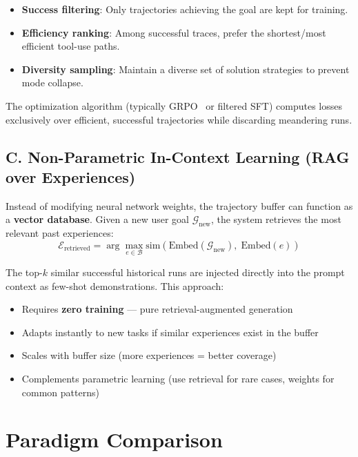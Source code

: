\begin{itemize}
  \item \textbf{Success filtering}: Only trajectories achieving the goal are kept for training.
  \item \textbf{Efficiency ranking}: Among successful traces, prefer the shortest/most efficient tool-use paths.
  \item \textbf{Diversity sampling}: Maintain a diverse set of solution strategies to prevent mode collapse.
\end{itemize}

The optimization algorithm (typically GRPO~\cite{shao2024deepseekmath} or filtered SFT) computes losses exclusively over efficient, successful trajectories while discarding meandering runs.

\subsection{C. Non-Parametric In-Context Learning (RAG over Experiences)}
\label{c.-non-parametric-in-context-learning-rag-over-experiences}

Instead of modifying neural network weights, the trajectory buffer can function as a \textbf{vector database}. Given a new user goal $\mathcal{G}_{\text{new}}$, the system retrieves the most relevant past experiences: 
\begin{equation}
\boxed{\mathcal{E}_{\text{retrieved}} = \arg\max_{e \in \mathcal{B}} \text{sim}\!\left(\text{Embed}(\mathcal{G}_{\text{new}}),\; \text{Embed}(e)\right)}
\end{equation}

The top-$k$ similar successful historical runs are injected directly into the prompt context as few-shot demonstrations. This approach:

\begin{itemize}
  \item Requires \textbf{zero training} --- pure retrieval-augmented generation
  \item Adapts instantly to new tasks if similar experiences exist in the buffer
  \item Scales with buffer size (more experiences = better coverage)
  \item Complements parametric learning (use retrieval for rare cases, weights for common patterns)
\end{itemize}

\section{Paradigm Comparison}
\label{paradigm-comparison}

